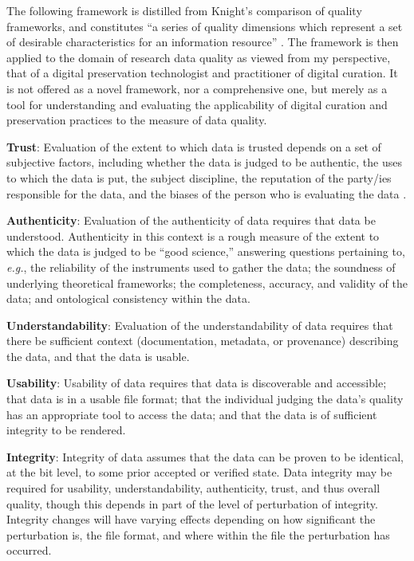 \documentclass[man,12pt,biblatex]{apa6}
\begin{document}
The following framework is distilled from Knight's comparison of
quality frameworks, and constitutes ``a series of quality dimensions
which represent a set of desirable characteristics for an information
resource'' \parencite{curry:community}. The framework is then applied to
the domain of research data quality as viewed from my perspective,
that of a digital preservation technologist and practitioner of
digital curation. It is not offered as a novel framework, nor a
comprehensive one, but merely as a tool for understanding and
evaluating the applicability of digital curation and preservation
practices to the measure of data quality.

\begin{APAitemize}
\item \textbf{Trust}: Evaluation of the extent to which data is
  trusted depends on a set of subjective factors, including whether
  the data is judged to be authentic, the uses to which the data is
  put, the subject discipline, the reputation of the party/ies
  responsible for the data, and the biases of the person who is
  evaluating the data .
\item \textbf{Authenticity}: Evaluation of the authenticity of data
  requires that data be understood. Authenticity in this context is a
  rough measure of the extent to which the data is judged to be ``good
  science,'' answering questions pertaining to, \textit{e.g.}, the
  reliability of the instruments used to gather the data; the
  soundness of underlying theoretical frameworks; the completeness,
  accuracy, and validity of the data; and ontological consistency
  within the data.
\item \textbf{Understandability}: Evaluation of the understandability
  of data requires that there be sufficient context (documentation,
  metadata, or provenance) describing the data, and that the data is
  usable.
\item \textbf{Usability}: Usability of data requires that data is
  discoverable and accessible; that data is in a usable file format;
  that the individual judging the data's quality has an appropriate
  tool to access the data; and that the data is of sufficient
  integrity to be rendered.
\item \textbf{Integrity}: Integrity of data assumes that the data can
  be proven to be identical, at the bit level, to some prior accepted
  or verified state. Data integrity may be required for usability,
  understandability, authenticity, trust, and thus overall quality,
  though this depends in part of the level of perturbation of
  integrity. Integrity changes will have varying effects depending on
  how significant the perturbation is, the file format, and where
  within the file the perturbation has occurred.
\end{APAitemize}
\end{document}
